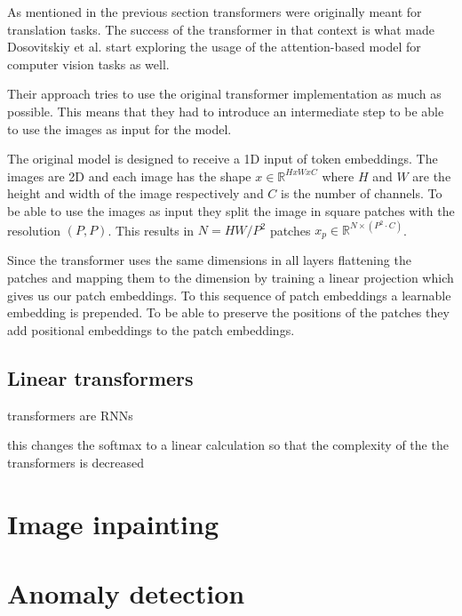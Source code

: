 As mentioned in the previous section transformers were originally meant for translation tasks. The success of the transformer in that context is what made Dosovitskiy et al.\cite{dosovitskiy_image_2021} start exploring the usage of the attention-based model for computer vision tasks as well.

Their approach tries to use the original transformer implementation as much as possible. This means that they had to introduce an intermediate step to be able to use the images as input for the model.

The original model is designed to receive a 1D input of token embeddings. The images are 2D and each image has the shape $x \in \mathbb{R}^{HxWxC}$ where $H$ and $W$ are the height and width of the image respectively and $C$ is the number of channels. To be able to use the images as input they split the image in square patches with the resolution $(P, P)$. This results in $N = HW/P^2$ patches $x_p \in \mathbb{R}^{N \times (P^2 \cdot C)}$.

Since the transformer uses the same dimensions in all layers flattening the patches and mapping them to the dimension by training a linear projection which gives us our patch embeddings. To this sequence of patch embeddings a learnable embedding is prepended. To be able to preserve the positions of the patches they add positional embeddings to the patch embeddings.

\subsection{Linear transformers}

\cite{katharopoulos_transformers_2020}

transformers are RNNs

this changes the softmax to a linear calculation so that the complexity of the the transformers is decreased

\iffalse

\fi


\section{Image inpainting}
\label{sec:image-inpainting}



\iffalse

\fi


\section{Anomaly detection}
\label{sec:anomaly-detection}



\iffalse

\fi



\iffalse
- Unsupervised learning
- Anomaly detection
- Transformers
\fi
